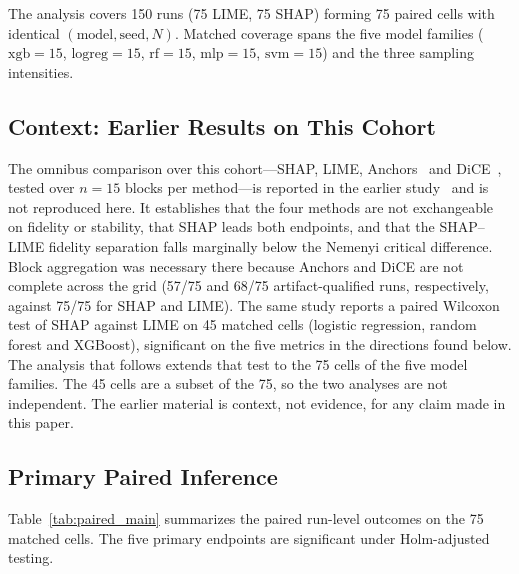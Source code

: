 \documentclass[11pt,a4paper]{article}
\begin{document}
The analysis covers 150 runs (75 LIME, 75 SHAP) forming 75 paired cells
with identical $(\mathrm{model}, \mathrm{seed}, N)$. Matched coverage spans
the five model families ($\mathrm{xgb}=15$, $\mathrm{logreg}=15$,
$\mathrm{rf}=15$, $\mathrm{mlp}=15$, $\mathrm{svm}=15$) and the three
sampling intensities.

\subsection{Context: Earlier Results on This Cohort}

The omnibus comparison over this cohort---SHAP, LIME,
Anchors~\cite{ribeiro2018anchors} and DiCE~\cite{mothilal2020dice}, tested
over $n=15$ blocks per method---is reported in the earlier
study~\cite{herrera2026framework} and is not reproduced here. It
establishes that the four methods are not exchangeable on fidelity or
stability, that SHAP leads both endpoints, and that the SHAP--LIME fidelity
separation falls marginally below the Nemenyi critical difference. Block
aggregation was necessary there because Anchors and DiCE are not complete
across the grid (57/75 and 68/75 artifact-qualified runs, respectively,
against 75/75 for SHAP and LIME). The same study reports a paired Wilcoxon
test of SHAP against LIME on 45 matched cells (logistic regression, random
forest and XGBoost), significant on the five metrics in the directions found
below. The analysis that follows extends that test to the 75 cells of the
five model families. The 45 cells are a subset of the 75, so the two
analyses are not independent. The earlier material is context, not evidence,
for any claim made in this paper.

\subsection{Primary Paired Inference}

Table~\ref{tab:paired_main} summarizes the paired run-level outcomes on the
75 matched cells. The five primary endpoints are significant under
Holm-adjusted testing.
\end{document}
